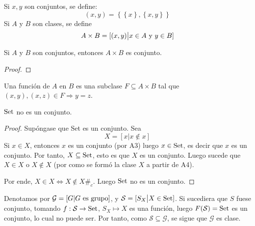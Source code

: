 \documentclass[12pt]{report}
\theoremstyle{largebreak}
\newcommand\cf[3]{\ensuremath{#1:#2\rightarrow#3}}
\newcommand\contradiction{\ensuremath{\#_c}}
\begin{document}
    \begin{mydef}
        Si $x,y$ son conjuntos, se define:
        \begin{equation*}
            (x,y)=\left\{\left\{x\right\},\left\{x,y\right\} \right\}
        \end{equation*}
        Si $A$ y $B$ son clases, se define
        \begin{equation*}
            A\times B = [(x,y)\big| x\in A\textup{ y }y\in B ]
        \end{equation*}
    \end{mydef}

    \begin{excer}
        Si $A$ y $B$ son conjuntos, entonces $A\times B$ es conjunto.
    \end{excer}

    \begin{proof}
        
    \end{proof}

    \begin{mydef}
        Una función de $A$ en $B$ es una subclase $F\subseteq A\times B$ tal que $(x,y),(x,z)\in F\Rightarrow y=z$.
    \end{mydef}

    \begin{exa}
        $\textup{Set}$ no es un conjunto.
    \end{exa}

    \begin{proof}
        Supóngase que Set es un conjunto. Sea
        \begin{equation*}
            X=[x\big| x\notin x]
        \end{equation*}
        Si $x\in X$, entonces $x$ es un conjunto (por A3) luego $x\in\textup{Set}$, es decir que $x$ es un conjunto. Por tanto, $X\subseteq\textup{Set}$, esto es que $X$ es un conjunto. Luego sucede que $X\in X$ o $X\notin X$ (por como se formó la clase $X$ a partir de A4).
        
        Por ende, $X\in X\iff X\notin X$\contradiction. Luego $\textup{Set}$ no es un conjunto.
    \end{proof}

    \begin{exa}
       Denotamos por $\mathcal{G}=[G| G\textup{ es grupo}]$, y $\mathcal{S}=[S_X\big| X\in\textup{Set}]$. Si sucediera que $S$ fuese conjunto, tomando $\cf{f}{\mathcal{S}}{\textup{Set}}$, $S_X\mapsto X$ es una función, luego $F(\mathcal{S})=\textup{Set}$ es un conjunto, lo cual no puede ser. Por tanto, como $\mathcal{S}\subseteq\mathcal{G}$, se sigue que $\mathcal{G}$ es clase.
    \end{exa}
\end{document}
